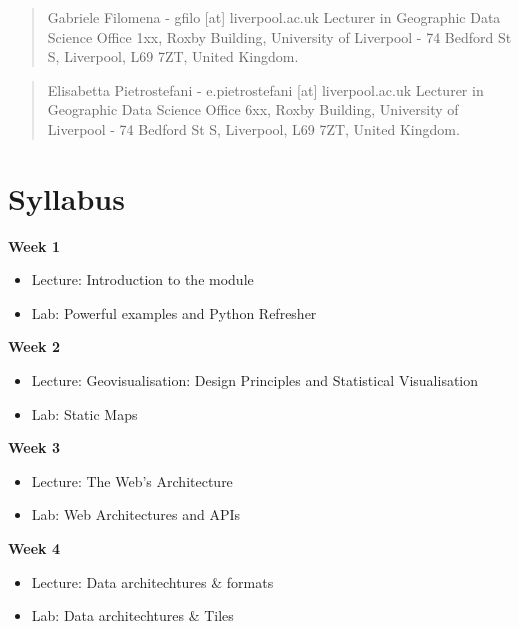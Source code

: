 \documentclass[
  letterpaper,
  DIV=11,
  numbers=noendperiod]{scrreprt}
\begin{document}

\begin{quote}
Gabriele Filomena - gfilo {[}at{]} liverpool.ac.uk Lecturer in
Geographic Data Science Office 1xx, Roxby Building, University of
Liverpool - 74 Bedford St S, Liverpool, L69 7ZT, United Kingdom.
\end{quote}

\begin{quote}
Elisabetta Pietrostefani - e.pietrostefani {[}at{]} liverpool.ac.uk
Lecturer in Geographic Data Science Office 6xx, Roxby Building,
University of Liverpool - 74 Bedford St S, Liverpool, L69 7ZT, United
Kingdom.
\end{quote}


\hypertarget{syllabus}{%
\chapter*{Syllabus}\label{syllabus}}


\textbf{Week 1}

\begin{itemize}
\item
  Lecture: Introduction to the module
\item
  Lab: Powerful examples and Python Refresher
\end{itemize}

\textbf{Week 2}

\begin{itemize}
\item
  Lecture: Geovisualisation: Design Principles and Statistical
  Visualisation
\item
  Lab: Static Maps
\end{itemize}

\textbf{Week 3}

\begin{itemize}
\item
  Lecture: The Web's Architecture
\item
  Lab: Web Architectures and APIs
\end{itemize}

\textbf{Week 4}

\begin{itemize}
\item
  Lecture: Data architechtures \& formats
\item
  Lab: Data architechtures \& Tiles
\end{itemize}
\end{document}
